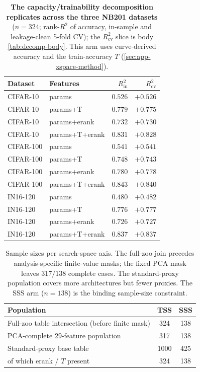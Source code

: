 \begin{table}[htbp]\centering\small\setlength{\tabcolsep}{5pt}
\begin{tabular}{ll rr}
\toprule
Dataset & Features & $R^2_{\mathrm{in}}$ & $R^2_{\mathrm{cv}}$\\\midrule
CIFAR-10 & params & $0.526$ & $+0.526$\\
CIFAR-10 & params+T & $0.779$ & $+0.775$\\
CIFAR-10 & params+erank & $0.732$ & $+0.730$\\
CIFAR-10 & params+T+erank & $0.831$ & $+0.828$\\
\midrule
CIFAR-100 & params & $0.541$ & $+0.541$\\
CIFAR-100 & params+T & $0.748$ & $+0.743$\\
CIFAR-100 & params+erank & $0.780$ & $+0.778$\\
CIFAR-100 & params+T+erank & $0.843$ & $+0.840$\\
\midrule
IN16-120 & params & $0.480$ & $+0.482$\\
IN16-120 & params+T & $0.776$ & $+0.777$\\
IN16-120 & params+erank & $0.726$ & $+0.727$\\
IN16-120 & params+T+erank & $0.837$ & $+0.837$\\
\bottomrule\end{tabular}
\caption{\textbf{The capacity/trainability decomposition replicates across the
three NB201 datasets} ($n{=}324$; rank-$R^2$ of accuracy, in-sample and
leakage-clean 5-fold CV); the $R^2_{\mathrm{cv}}$ slice is body
\cref{tab:decomp-body}. This arm uses curve-derived accuracy and the
train-accuracy $T$ (\cref{sec:app-xspace-method}).}
\label{tab:app-decomp}
\end{table}

\begin{table}[htbp]
  \centering
  \small
  \begin{tabular}{lcc}
    \toprule
    Population & TSS & SSS \\
    \midrule
    Full-zoo table intersection (before finite mask) & 324 & 138 \\
    PCA-complete 29-feature population      & 317 & 138 \\
    Standard-proxy base table              & 1000 & 425 \\
    \quad of which erank / $T$ present      & 324 & 138 \\
    \bottomrule
  \end{tabular}
  \caption{Sample sizes per search-space axis. The full-zoo join precedes
  analysis-specific finite-value masks; the fixed PCA mask leaves $317/138$
  complete cases. The standard-proxy population covers more architectures but
  fewer proxies. The SSS arm ($n{=}138$) is the binding sample-size constraint.}
  \label{tab:setup-n}
\end{table}

